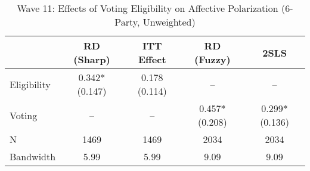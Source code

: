 \begin{table}[htbp]
\centering
\caption{Wave 11: Effects of Voting Eligibility on Affective Polarization (6-Party, Unweighted)}
\label{tab:wave11_k6_un}
\begin{tabular}{lcccc}
\hline
 & RD (Sharp) & ITT Effect & RD (Fuzzy) & 2SLS \\
\hline
Eligibility & 0.342* (0.147) & 0.178 (0.114) & -- & -- \\
Voting & -- & -- & 0.457* (0.208) & 0.299* (0.136) \\
\hline
N & 1469 & 1469 & 2034 & 2034 \\
Bandwidth & 5.99 & 5.99 & 9.09 & 9.09 \\
\hline
\end{tabular}
\end{table}
